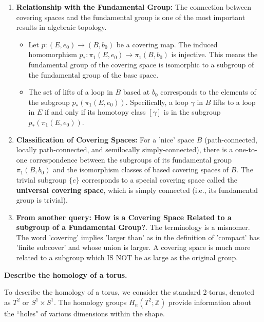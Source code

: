 \documentclass[12pt,a4paper]{report}
\begin{document}
\begin{description}
\begin{enumerate}
\item \textbf{\textbf{Relationship with the Fundamental Group:}} The connection between covering spaces and the fundamental group is one of the most important results in algebraic topology.
\begin{itemize}

    \item Let \(p: (E, e_0) \to (B, b_0)\) be a covering map. The induced homomorphism \(p_*: \pi_1(E, e_0) \to \pi_1(B, b_0)\) is injective. This means the fundamental group of the covering space is isomorphic to a subgroup of the fundamental group of the base space.
    \item The set of lifts of a loop in \(B\) based at \(b_0\) corresponds to the elements of the subgroup \(p_*(\pi_1(E, e_0))\). Specifically, a loop \(\gamma\) in \(B\) lifts to a loop in \(E\) if and only if its homotopy class \([\gamma]\) is in the subgroup \(p_*(\pi_1(E, e_0))\).
\end{itemize}

\item \textbf{\textbf{Classification of Covering Spaces:}} For a 'nice' space \(B\) (path-connected, locally path-connected, and semilocally simply-connected), there is a one-to-one correspondence between the subgroups of its fundamental group \(\pi_1(B, b_0)\) and the isomorphism classes of based covering spaces of \(B\). The trivial subgroup \(\{e\}\) corresponds to a special covering space called the \textbf{universal covering space}, which is simply connected (i.e., its fundamental group is trivial).

\item \textbf{From another query: How is a Covering Space Related to a subgroup of a Fundamental Group?}.  The terminology is a misnomer.  The word 'covering' implies 'larger than' as in the definition of 'compact' has 'finite subcover' and whose union is larger.  A covering space is much more related to a subgroup which IS NOT be as large as the original group.
\end{enumerate}

\newpage
\item \textbf{Describe the homology of a torus.}

To describe the homology of a torus, we consider the standard 2-torus, denoted as $T^2$ or $S^1 \times S^1$. The homology groups $H_n(T^2; \mathbb{Z})$ provide information about the ``holes" of various dimensions within the shape.


\end{description}
\end{document}
